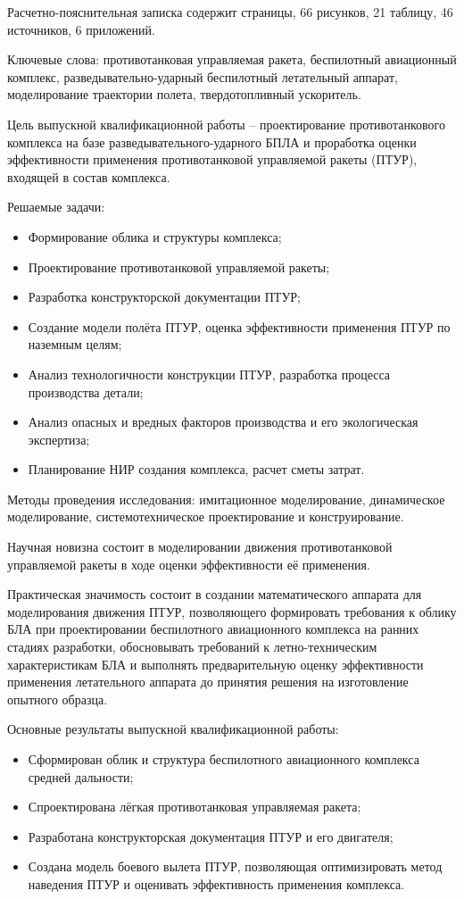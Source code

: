 \Referat

Расчетно-пояснительная записка содержит \pageref{LastPage} страницы, 66 рисунков, 21 таблицу, 46 источников, 6 приложений.

Ключевые слова: противотанковая управляемая ракета, беспилотный авиационный комплекс, разведывательно-ударный беспилотный летательный аппарат, моделирование траектории полета, твердотопливный ускоритель.

Цель выпускной квалификационной работы – проектирование противотанкового комплекса на базе разведывательного-ударного БПЛА и проработка оценки эффективности применения противотанковой управляемой ракеты (ПТУР), входящей в состав комплекса.

Решаемые задачи:
\begin{itemize}
	\item Формирование облика и структуры комплекса;
	\item Проектирование противотанковой управляемой ракеты;
	\item Разработка конструкторской документации ПТУР;
	\item Создание модели полёта ПТУР, оценка эффективности применения ПТУР по наземным целям;
	\item Анализ технологичности конструкции ПТУР, разработка процесса производства детали;
	\item Анализ опасных и вредных факторов производства и его экологическая экспертиза;
	\item Планирование НИР создания комплекса, расчет сметы затрат.
\end{itemize}

Методы проведения исследования: имитационное моделирование, динамическое моделирование, системотехническое проектирование и конструирование.

Научная новизна состоит в моделировании движения противотанковой управляемой ракеты в ходе оценки эффективности её применения.

Практическая значимость состоит в создании математического аппарата для моделирования движения ПТУР, позволяющего формировать требования к облику БЛА при проектировании беспилотного авиационного комплекса на ранних стадиях разработки, обосновывать требований к летно-техническим характеристикам БЛА и выполнять предварительную оценку эффективности применения летательного аппарата до принятия решения на изготовление опытного образца.

Основные результаты выпускной квалификационной работы:
\begin{itemize}
	\item Сформирован облик и структура беспилотного авиационного комплекса средней дальности;
	\item Спроектирована лёгкая противотанковая управляемая ракета;
	\item Разработана конструкторская документация ПТУР и его двигателя;
	\item Создана модель боевого вылета ПТУР, позволяющая оптимизировать метод наведения ПТУР и оценивать эффективность применения комплекса.
\end{itemize}
